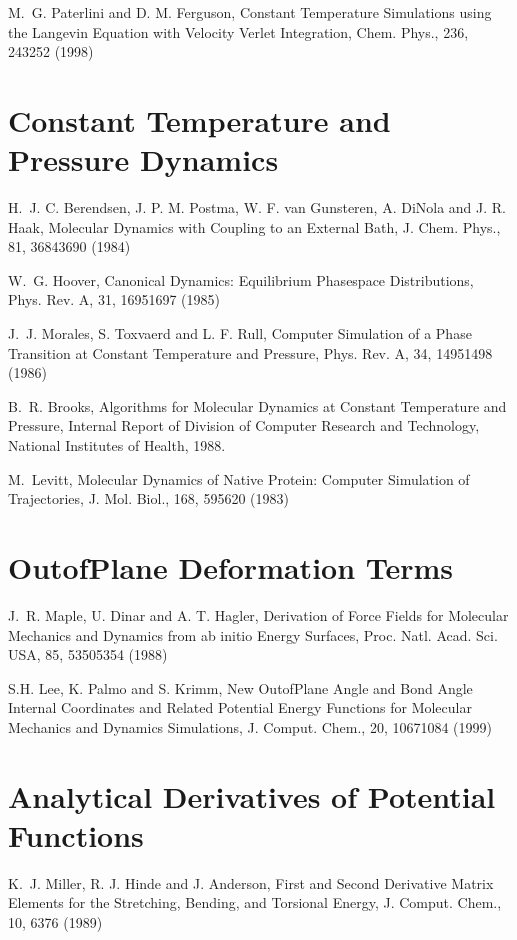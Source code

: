 \documentclass[letterpaper,11pt,english]{sphinxmanual}
\begin{document}
M. G. Paterlini and D. M. Ferguson, Constant Temperature Simulations using the Langevin Equation with Velocity Verlet Integration, Chem. Phys., 236, 243\sphinxhyphen{}252 (1998)


\section{Constant Temperature and Pressure Dynamics}
\label{\detokenize{text/references:constant-temperature-and-pressure-dynamics}}
H. J. C. Berendsen, J. P. M. Postma, W. F. van Gunsteren, A. DiNola and J. R. Haak, Molecular Dynamics with Coupling to an External Bath, J. Chem. Phys., 81, 3684\sphinxhyphen{}3690 (1984)

W. G. Hoover, Canonical Dynamics: Equilibrium Phase\sphinxhyphen{}space Distributions, Phys. Rev. A, 31, 1695\sphinxhyphen{}1697 (1985)

J. J. Morales, S. Toxvaerd and L. F. Rull, Computer Simulation of a Phase Transition at Constant Temperature and Pressure, Phys. Rev. A, 34, 1495\sphinxhyphen{}1498 (1986)

B. R. Brooks, Algorithms for Molecular Dynamics at Constant Temperature and Pressure, Internal Report of Division of Computer Research and Technology, National Institutes of Health, 1988.

M. Levitt, Molecular Dynamics of Native Protein: Computer Simulation of Trajectories, J. Mol. Biol., 168, 595\sphinxhyphen{}620 (1983)


\section{Out\sphinxhyphen{}of\sphinxhyphen{}Plane Deformation Terms}
\label{\detokenize{text/references:out-of-plane-deformation-terms}}
J. R. Maple, U. Dinar and A. T. Hagler, Derivation of Force Fields for Molecular Mechanics and Dynamics from ab initio Energy Surfaces, Proc. Natl. Acad. Sci. USA, 85, 5350\sphinxhyphen{}5354 (1988)

S.\sphinxhyphen{}H. Lee, K. Palmo and S. Krimm, New Out\sphinxhyphen{}of\sphinxhyphen{}Plane Angle and Bond Angle Internal Coordinates and Related Potential Energy Functions for Molecular Mechanics and Dynamics Simulations, J. Comput. Chem., 20, 1067\sphinxhyphen{}1084 (1999)


\section{Analytical Derivatives of Potential Functions}
\label{\detokenize{text/references:analytical-derivatives-of-potential-functions}}
K. J. Miller, R. J. Hinde and J. Anderson, First and Second Derivative Matrix Elements for the Stretching, Bending, and Torsional Energy, J. Comput. Chem., 10, 63\sphinxhyphen{}76 (1989)
\end{document}
